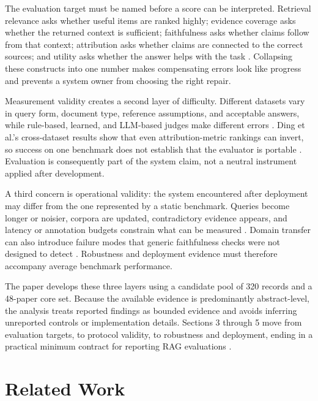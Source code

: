 \documentclass[a4paper,11pt]{article}
\begin{document}
The evaluation target must be named before a score can be interpreted. Retrieval relevance asks whether useful items are ranked highly; evidence coverage asks whether the returned context is sufficient; faithfulness asks whether claims follow from that context; attribution asks whether claims are connected to the correct sources; and utility asks whether the answer helps with the task \citep{Ding2026Attribution,Nematov2025Source,SaadFalcon2023Ares}. Collapsing these constructs into one number makes compensating errors look like progress and prevents a system owner from choosing the right repair.

Measurement validity creates a second layer of difficulty. Different datasets vary in query form, document type, reference assumptions, and acceptable answers, while rule-based, learned, and LLM-based judges make different errors \citep{Zhang2026Before,Li2026Mrag,Upadhyay2026Overview}. Ding et al.'s cross-dataset results show that even attribution-metric rankings can invert, so success on one benchmark does not establish that the evaluator is portable \citep{Ding2026Attribution}. Evaluation is consequently part of the system claim, not a neutral instrument applied after development.

A third concern is operational validity: the system encountered after deployment may differ from the one represented by a static benchmark. Queries become longer or noisier, corpora are updated, contradictory evidence appears, and latency or annotation budgets constrain what can be measured \citep{Upadhyay2026Overview,Zhang2026Before,Javadi2025Contradictions}. Domain transfer can also introduce failure modes that generic faithfulness checks were not designed to detect \citep{Caruzzo2026Deceptive,Brehme2025Retrieval}. Robustness and deployment evidence must therefore accompany average benchmark performance.

The paper develops these three layers using a candidate pool of 320 records and a 48-paper core set. Because the available evidence is predominantly abstract-level, the analysis treats reported findings as bounded evidence and avoids inferring unreported controls or implementation details. Sections 3 through 5 move from evaluation targets, to protocol validity, to robustness and deployment, ending in a practical minimum contract for reporting RAG evaluations \citep{Murugaraj2025Ragvue,Cahoon2025Optimizing,Zhou2024Trustworthiness}.
\section{Related Work}
\end{document}
